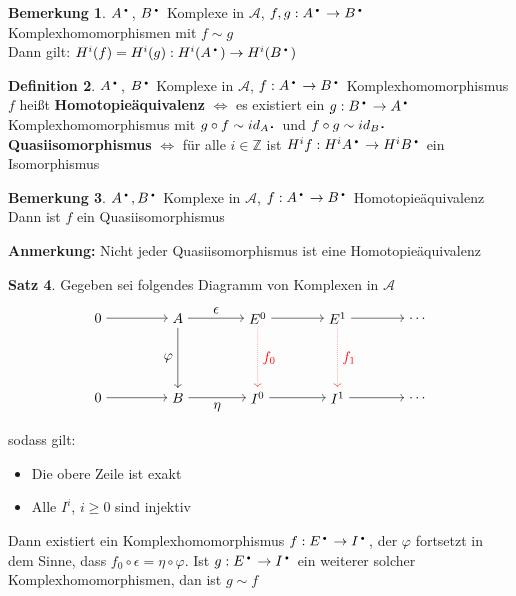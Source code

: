 \documentclass[10pt,a4paper,numbers=endperiod]{scrreprt}
\theoremstyle{definition}
\newtheorem{satz}{Satz}[section]
\newtheorem{defi}[satz]{Definition}
\newtheorem{bem}[satz]{Bemerkung}
\newcommand{\point}{\text{\textbullet}}
\def\ZZ{{\mathbb Z}}
\begin{document}
\begin{bem}
	$A^\point$, $B^\point$ Komplexe in $\mathcal{A}$, $f,g: A^\point \to B^\point$ Komplexhomomorphismen mit $f \sim g$\\
	Dann gilt: $H^i(f) = H^i(g): H^i(A^\point) \to H^i(B^\point)$
\end{bem}
\newpage
\begin{defi}
	$A^\point$, $B^\point$ Komplexe in $\mathcal{A}$, $f: A^\point \to B^\point$ Komplexhomomorphismus\\
	$f$ heißt \textbf{Homotopieäquivalenz} $\Leftrightarrow$ es existiert ein $g:B^\point \to A^\point$ Komplexhomomorphismus mit $g \circ f \sim id_{A^\point}$ und \hspace*{49mm} $f \circ g \sim id_{B^\point}$\\
	\hspace*{11mm} \textbf{Quasiisomorphismus} $\Leftrightarrow$ für alle $i \in \ZZ$ ist $H^if: H^iA^\point \to H^iB^\point$ ein Isomorphismus
\end{defi}

\begin{bem}
	$A^\point, B^\point$ Komplexe in $\mathcal{A}$, $f: A^\point \to B^\point$ Homotopieäquivalenz\\
	Dann ist $f$ ein Quasiisomorphismus 
\end{bem}

\textbf{Anmerkung:} Nicht jeder Quasiisomorphismus ist eine Homotopieäquivalenz

\begin{satz}
	Gegeben sei folgendes Diagramm von Komplexen in $\mathcal{A}$ \begin{align*}
	\begin{tikzpicture}{
		\node (30) at (1,2) {$0$};
		\node (31) at (3,2) {$ A $};
		\node (32) at (5,2) {$ E^0 $};
		\node (33) at (7,2) {$ E^1 $};
		\node (34) at (9,2) {$ \ldots $};
		\node (40) at (1,0) {$ 0 $};
		\node (41) at (3,0) {$ B $};
		\node (42) at (5,0) {$ I^0 $};
		\node (43) at (7,0) {$ I^1 $};
		\node (44) at (9,0) {$ \ldots $};
		\draw[->] (30) edge (31);
		\draw[->] (31) edge node[above] {$\epsilon$} (32);
		\draw[->] (32) edge (33);
		\draw[->] (33) edge (34);
		\draw[->] (31) edge node[left] {$\varphi$} (41);
		\draw[red][->, densely dotted] (32) edge node[right] {$f_0$} (42);
		\draw[red][->, densely dotted] (33) edge node[right] {$f_1$} (43);
		\draw[->] (40) edge (41);
		\draw[->] (41) edge node[below] {$\eta$} (42);
		\draw[->] (42) edge (43);
		\draw[->] (43) edge (44);}
	\end{tikzpicture}
	\end{align*}
	sodass gilt: \begin{itemize}
		\item Die obere Zeile ist exakt
		\item Alle $I^i$, $i \geq 0$ sind injektiv
	\end{itemize}
	Dann existiert ein Komplexhomomorphismus $f: E^\point \to I^\point$, der $\varphi$ fortsetzt in dem Sinne, dass $f_0 \circ \epsilon = \eta \circ \varphi$. Ist $g: E^\point \to I^\point$ ein weiterer solcher Komplexhomomorphismen, dan ist $g \sim f$
\end{satz}
\end{document}
